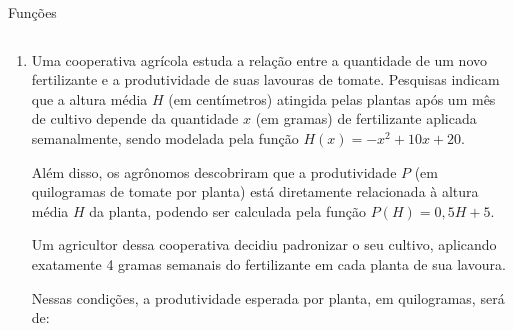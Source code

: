 \documentclass[aspectratio=169, t, 8pt]{beamer}
\newcounter{questaovest}
\newcommand{\vest}{\stepcounter{questaovest}\item[\textbf{Questão \arabic{questaovest}}:]}
\begin{document}
    \begin{frame}{Funções}
        \begin{columns}[totalwidth=.9\textwidth]
            \begin{column}{\textwidth}
                \begin{enumerate}
                    \vest  Uma cooperativa agrícola estuda a relação entre a quantidade de um novo fertilizante e a produtividade de suas lavouras de tomate. Pesquisas indicam que a altura média $H$ (em centímetros) atingida pelas plantas após um mês de cultivo depende da quantidade $x$ (em gramas) de fertilizante aplicada semanalmente, sendo modelada pela função $H(x) = -x^2 + 10x + 20$.
                    
                    \vspace{1em}

                    Além disso, os agrônomos descobriram que a produtividade $P$ (em quilogramas de tomate por planta) está diretamente relacionada à altura média $H$ da planta, podendo ser calculada pela função $P(H) = 0,5H + 5$.
                    
                    \vspace{1em}

                    Um agricultor dessa cooperativa decidiu padronizar o seu cultivo, aplicando exatamente 4 gramas semanais do fertilizante em cada planta de sua lavoura.
                    
                    \vspace{1em}
                    
                    Nessas condições, a produtividade esperada por planta, em quilogramas, será de:

                    \vspace{1.2em}
                    
                    \begin{minipage}{.7\textwidth}
                    \end{minipage}
                \end{enumerate}
            \end{column}
        \end{columns}
    \end{frame}
\end{document}
